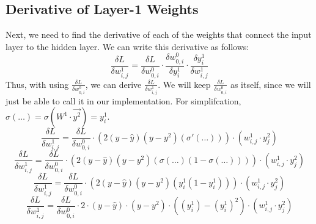 \documentclass[10pt]{article}
\begin{document}
\subsection{Derivative of Layer-1 Weights}
Next, we need to find the derivative of each of the weights that connect the input layer to the hidden layer. We can write this derivative as follows:
$$\frac{\delta L}{\delta w^1_{i,j}} = \frac{\delta L}{\delta w^0_{0,i}} \cdot \frac{\delta w^0_{0,i}}{\delta y^1_i} \cdot \frac{\delta y^1_i}{\delta w^1_{i,j}}$$
Thus, with using $\frac{\delta L}{\delta w^0_{0,i}}$, we can derive $\frac{\delta L}{\delta w^1_{i,j}}$. We will keep $\frac{\delta L}{\delta w^0_{0,i}}$ as itself, since we will just be able to call it in our implementation.
\newline
For simplifcation, $\sigma(\ldots) = \sigma(W^1 \cdot \vec{y^2}) = y^1_i$.
$$\frac{\delta L}{\delta w^1_{i,j}} = \frac{\delta L}{\delta w^0_{0,i}} \cdot (2(y-\hat{y})(y - y^2)(\sigma'(\ldots))) \cdot (w^1_{i,j} \cdot y^2_{j})$$
$$\frac{\delta L}{\delta w^1_{i,j}} = \frac{\delta L}{\delta w^0_{0,i} } \cdot (2(y - \hat{y})(y - y^2)(\sigma(\ldots)(1 - \sigma(\ldots)))) \cdot (w^1_{i,j} \cdot y^2_{j})$$
$$\frac{\delta L}{\delta w^1_{i,j}} = \frac{\delta L}{\delta w^0_{0,i}} \cdot (2(y - \hat{y})(y - y^2)(y^1_i (1 - y^1_i))) \cdot (w^1_{i,j} \cdot y^2_{j})$$
$$\frac{\delta L}{\delta w^1_{i,j}} = \frac{\delta L}{\delta w^0_{0,i}} \cdot 2 \cdot (y - \hat{y}) \cdot (y - y^2) \cdot ((y^1_i) - (y^1_i)^2) \cdot (w^1_{i,j} \cdot y^2_{j})$$
\end{document}
